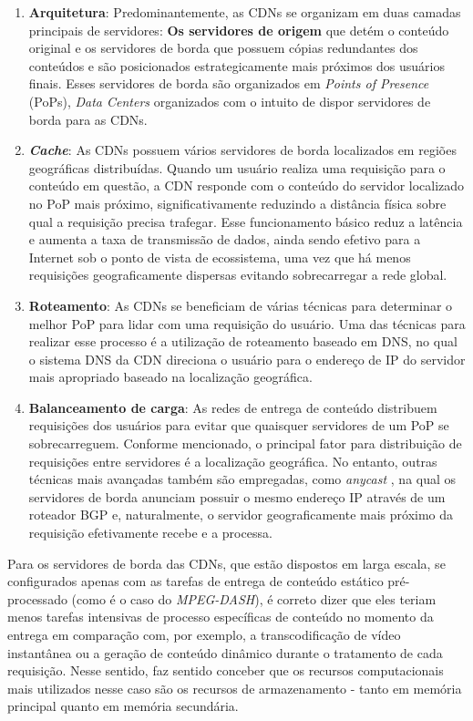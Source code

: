 \begin{enumerate}
    \item{\textbf{Arquitetura}}: Predominantemente, as CDNs se organizam em duas camadas principais de servidores: \textbf{Os servidores de origem} que detém o conteúdo original e os servidores de borda que possuem cópias redundantes dos conteúdos e são posicionados estrategicamente mais próximos dos usuários finais. Esses servidores de borda são organizados em \textit{Points of Presence} (PoPs), \textit{Data Centers} organizados com o intuito de dispor servidores de borda para as CDNs. 
    \item{\textbf{\textit{Cache}}}: As CDNs possuem vários servidores de borda localizados em regiões geográficas distribuídas. Quando um usuário realiza uma requisição para o conteúdo em questão, a CDN responde com o conteúdo do servidor localizado no PoP mais próximo, significativamente reduzindo a distância física sobre qual a requisição precisa trafegar. Esse funcionamento básico reduz a latência e aumenta a taxa de transmissão de dados, ainda sendo efetivo para a Internet sob o ponto de vista de ecossistema, uma vez que há menos requisições geograficamente dispersas evitando sobrecarregar a rede global.
    \item{\textbf{Roteamento}}: As CDNs se beneficiam de várias técnicas para determinar o melhor PoP para lidar com uma requisição do usuário. Uma das técnicas para realizar esse processo é a utilização de roteamento baseado em DNS, no qual o sistema DNS da CDN direciona o usuário para o endereço de IP do servidor mais apropriado baseado na localização geográfica.
    \item{\textbf{Balanceamento de carga}}: As redes de entrega de conteúdo distribuem requisições dos usuários para evitar que quaisquer servidores de um PoP se sobrecarreguem. Conforme mencionado, o principal fator para distribuição de requisições entre servidores é a localização geográfica. No entanto, outras técnicas mais avançadas também são empregadas, como \textit{anycast} \cite{Preston2021Finding}, na qual os servidores de borda anunciam possuir o mesmo endereço IP através de um roteador BGP e, naturalmente, o servidor geograficamente mais próximo da requisição efetivamente recebe e a processa.
\end{enumerate}

Para os servidores de borda das CDNs, que estão dispostos em larga escala, se configurados apenas com as tarefas de entrega de conteúdo estático pré-processado (como é o caso do \textit{MPEG-DASH}), é correto dizer que eles teriam menos tarefas intensivas de processo específicas de conteúdo no momento da entrega em comparação com, por exemplo, a transcodificação de vídeo instantânea ou a geração de conteúdo dinâmico durante o tratamento de cada requisição. Nesse sentido, faz sentido conceber que os recursos computacionais mais utilizados nesse caso são os recursos de armazenamento - tanto em memória principal quanto em memória secundária.

